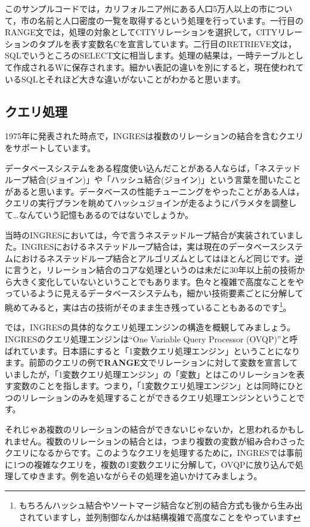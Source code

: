 このサンプルコードでは，カリフォルニア州にある人口5万人以上の市について，市の名前と人口密度の一覧を取得するという処理を行っています。一行目のRANGE文では，処理の対象としてCITYリレーションを選択して，CITYリレーションのタプルを表す変数名Cを宣言しています。二行目のRETRIEVE文は，SQLでいうところのSELECT文に相当します。処理の結果は，一時テーブルとして作成されるWに保存されます。細かい表記の違いを別にすると，現在使われているSQLとそれほど大きな違いがないことがわかると思います。


\subsection{クエリ処理}


1975年に発表された時点で，INGRESは複数のリレーションの結合を含むクエリをサポートしています。


データベースシステムをある程度使い込んだことがある人ならば，「ネステッドループ結合(ジョイン)」や「ハッシュ結合(ジョイン)」という言葉を聞いたことがあると思います。データベースの性能チューニングをやったことがある人は，クエリの実行プランを眺めてハッシュジョインが走るようにパラメタを調整して…なんていう記憶もあるのではないでしょうか。


当時のINGRESにおいては，今で言うネステッドループ結合が実装されていました。INGRESにおけるネステッドループ結合は，実は現在のデータベースシステムにおけるネステッドループ結合とアルゴリズムとしてはほとんど同じです。逆に言うと，リレーション結合のコアな処理というのは未だに30年以上前の技術から大きく変化していないということでもあります。色々と複雑で高度なことをやっているように見えるデータベースシステムも，細かい技術要素ごとに分解して眺めてみると，実は古の技術がそのまま生き残っていることもあるのです\footnote{もちろんハッシュ結合やソートマージ結合など別の結合方式も後から生み出されていますし，並列制御なんかは結構複雑で高度なことをやっています}。


では，INGRESの具体的なクエリ処理エンジンの構造を概観してみましょう。INGRESのクエリ処理エンジンは``One Variable Query Processor (OVQP)''と呼ばれています。日本語にすると「1変数クエリ処理エンジン」ということになります。前節のクエリの例で{\bf RANGE}文でリレーションに対して変数を宣言していましたが，「1変数クエリ処理エンジン」の「変数」とはこのリレーションを表す変数のことを指します。つまり，「1変数クエリ処理エンジン」とは同時にひとつのリレーションのみを処理することができるクエリ処理エンジンということです。

それじゃあ複数のリレーションの結合ができないじゃないか，と思われるかもしれません。複数のリレーションの結合とは，つまり複数の変数が組み合わさったクエリになるからです。このようなクエリを処理するために，INGRESでは事前に1つの複雑なクエリを，複数の1変数クエリに分解して，OVQPに放り込んで処理してゆきます。例を追いながらその処理を追いかけてみましょう。


